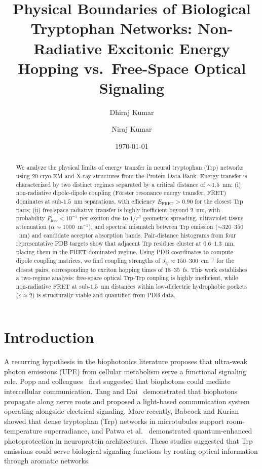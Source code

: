 \documentclass[aps,pre,twocolumn,showpacs,superscriptaddress]{revtex4-2}
\begin{document}
\title{Physical Boundaries of Biological Tryptophan Networks: Non-Radiative Excitonic Energy Hopping vs.~Free-Space Optical Signaling}

\author{Dhiraj Kumar}
\author{Niraj Kumar}

\date{\today}

\begin{abstract}
We analyze the physical limits of energy transfer in neural tryptophan (Trp) networks using 20 cryo-EM and X-ray structures from the Protein Data Bank. Energy transfer is characterized by two distinct regimes separated by a critical distance of $\sim1.5$~nm: (i) non-radiative dipole-dipole coupling (F\"orster resonance energy transfer, FRET) dominates at sub-$1.5$~nm separations, with efficiency $E_{\mathrm{FRET}} > 0.90$ for the closest Trp pairs; (ii) free-space radiative transfer is highly inefficient beyond $2$~nm, with probability $P_{\mathrm{free}} < 10^{-5}$ per exciton due to $1/r^2$ geometric spreading, ultraviolet tissue attenuation ($\alpha \sim 1000$~m$^{-1}$), and spectral mismatch between Trp emission ($\sim320$--$350$~nm) and candidate acceptor absorption bands. Pair-distance histograms from four representative PDB targets show that adjacent Trp residues cluster at $0.6$--$1.3$~nm, placing them in the FRET-dominated regime. Using PDB coordinates to compute dipole coupling matrices, we find coupling strengths of $J_{ij} \approx 150$--$300$~cm$^{-1}$ for the closest pairs, corresponding to exciton hopping times of $18$--$35$~fs. This work establishes a two-regime analysis: free-space optical Trp-Trp coupling is highly inefficient, while non-radiative FRET at sub-$1.5$~nm distances within low-dielectric hydrophobic pockets ($\varepsilon \approx 2$) is structurally viable and quantified from PDB data.
\end{abstract}

\maketitle

\section{Introduction}
\label{sec:intro}

A recurring hypothesis in the biophotonics literature proposes that ultra-weak photon emissions (UPE) from cellular metabolism serve a functional signaling role. Popp and colleagues~\cite{Popp1992} first suggested that biophotons could mediate intercellular communication. Tang and Dai~\cite{Tang2014} demonstrated that biophotons propagate along nerve roots and proposed a light-based communication system operating alongside electrical signaling. More recently, Babcock and Kurian~\cite{Babcock2024} showed that dense tryptophan (Trp) networks in microtubules support room-temperature superradiance, and Patwa et al.~\cite{Patwa2024} demonstrated quantum-enhanced photoprotection in neuroprotein architectures. These studies suggested that Trp emissions could serve biological signaling functions by routing optical information through aromatic networks.
\end{document}
